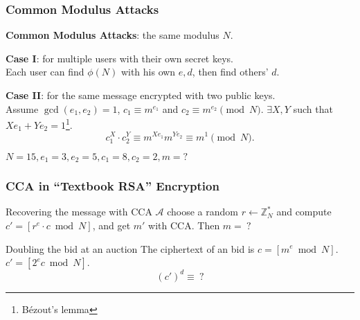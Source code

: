 \begin{frame}\frametitle{Common Modulus Attacks}
\textbf{Common Modulus Attacks}: the same modulus $N$.
\newline

\textbf{Case I}: for multiple users with their own secret keys.\\
Each user can find $\phi(N)$ with his own $e,d$, then find others' $d$.
\newline

\textbf{Case II}: for the same message encrypted with two public keys.\\
Assume $\gcd(e_1,e_2)=1$, $c_1 \equiv m^{e_1}$ and $c_2 \equiv m^{e_2} \pmod N$. $\exists X,Y$ such that $Xe_1 + Ye_2 = 1$\footnote{B\'{e}zout's lemma}.
\[ c_1^X\cdot c_2^Y \equiv m^{Xe_1}m^{Ye_2} \equiv m^1 \pmod N.\]
\begin{exampleblock}{$N = 15, e_{1} = 3, e_{2} = 5, c_{1} = 8, c_{2} = 2, m = ?$ } %
\end{exampleblock}
\end{frame}
\begin{frame}\frametitle{CCA in ``Textbook RSA'' Encryption}
\begin{exampleblock}{Recovering the message with CCA}
$\mathcal{A}$ choose a random $r \gets \mathbb{Z}^*_N$ and compute $c' = [r^e\cdot c \bmod N]$, and get $m'$ with CCA. Then $m=\ ?$%
\end{exampleblock}
\begin{exampleblock}{Doubling the bid at an auction}
The ciphertext of an bid is $c = [m^e \bmod N]$. $c'= [2^ec \bmod N]$.
\[(c')^d \equiv\ ? \]%
\end{exampleblock}
\end{frame}
